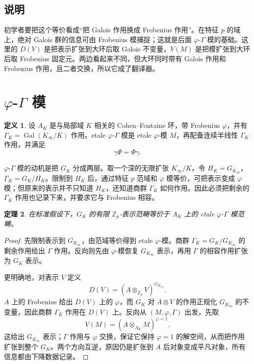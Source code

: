 \documentclass[11pt,a4paper,openany]{ctexbook}
\numberwithin{equation}{chapter}
\newcommand{\Z}{\mathbb{Z}}
\newcommand{\Gal}{\operatorname{Gal}}
\theoremstyle{plain}
\newtheorem{theorem}{定理}[chapter]
\theoremstyle{definition}
\newtheorem{definition}[theorem]{定义}
\theoremstyle{remark}
\begin{document}
\subsection{说明}

初学者要把这个等价看成“把 Galois 作用换成 Frobenius 作用”。在特征 $p$ 的域上，绝对 Galois 群的信息可由 Frobenius 模捕捉；这就是后面 $\varphi$-$\Gamma$ 模的基础。这里的 $D(V)$ 是把表示扩张到大环后取 Galois 不变量，$V(M)$ 是把模扩张到大环后取 Frobenius 固定元。两边看起来不同，但大环同时带有 Galois 作用和 Frobenius 作用，且二者交换，所以它成了翻译器。

\section{\texorpdfstring{$\varphi$-$\Gamma$ 模}{phi-Gamma 模}}

\begin{definition}
设 $A_K$ 是与局部域 $K$ 相关的 Cohen--Fontaine 环，带 Frobenius $\varphi$，并有 $\Gamma_K=\Gal(K_\infty/K)$ 作用。etale $\varphi$-$\Gamma$ 模是 etale $\varphi$-模 $M$，再配备连续半线性 $\Gamma_K$ 作用，并满足
\[
  \gamma\Phi=\Phi\gamma.
\]
\end{definition}

$\varphi$-$\Gamma$ 模的动机是把 $G_K$ 分成两层。取一个深的无限扩张 $K_\infty/K$，令 $H_K=G_{K_\infty}$，$\Gamma_K=G_K/H_K$。限制到 $H_K$ 后，通过特征 $p$ 范域和 $\varphi$ 模等价，可把表示变成 $\varphi$ 模；但原来的表示并不只知道 $H_K$，还知道商群 $\Gamma_K$ 如何作用。因此必须把剩余的 $\Gamma_K$ 作用也记录下来，并要求它与 Frobenius 相容。

\begin{theorem}
在标准假设下，$G_K$ 的有限 $\Z_p$-表示范畴等价于 $A_K$ 上的 etale $\varphi$-$\Gamma$ 模范畴。
\end{theorem}

\begin{proof}
先限制表示到 $G_{K_\infty}$，由范域等价得到 etale $\varphi$-模。商群 $\Gamma_K=G_K/G_{K_\infty}$ 的剩余作用给出 $\Gamma$ 作用。反向则先由 $\varphi$-模恢复 $G_{K_\infty}$ 表示，再用 $\Gamma$ 的相容作用扩张为 $G_K$ 表示。

更明确地，对表示 $V$ 定义
\[
  D(V)=(A\otimes_{\Z_p}V)^{G_{K_\infty}}.
\]
$A$ 上的 Frobenius 给出 $D(V)$ 上的 $\varphi$，而 $G_K$ 对 $A\otimes V$ 的作用正规化 $G_{K_\infty}$ 的不变量，因此商群 $\Gamma_K$ 作用在 $D(V)$ 上。反向从 $(M,\varphi,\Gamma)$ 出发，先取
\[
  V(M)=(A\otimes_{A_K}M)^{\varphi=1}.
\]
这给出 $G_{K_\infty}$ 表示；$\Gamma$ 作用与 $\varphi$ 交换，保证它保持 $\varphi=1$ 的解空间，从而把作用扩张到整个 $G_K$。两个方向互逆，原因仍是扩张到 $A$ 后对象变成平凡对象，所有信息都由下降数据记录。
\end{proof}
\end{document}
